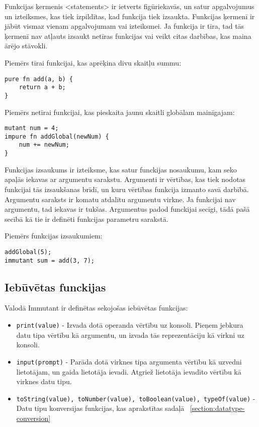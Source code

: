 \documentclass[12pt,a4paper]{report}
\begin{document}
Funkcijas ķermenis <statements> ir ietverts figūriekavās, un satur apgalvojumus un izteiksmes, kas tiek izpildītas, kad funkcija tiek izsaukta. Funkcijas ķermenī ir jābūt vismaz vienam apgalvojumam vai izteiksmei. Ja funkcija ir tīra, tad tās ķermenī nav atļauts izsaukt netīras funkcijas vai veikt citas darbības, kas maina ārējo stāvokli.

Piemērs tīrai funkcijai, kas aprēķina divu skaitļu summu:
\begin{verbatim}
pure fn add(a, b) {
    return a + b;
}
\end{verbatim}

Piemērs netīrai funkcijai, kas pieskaita jaunu skaitli globālam mainīgajam:
\begin{verbatim}
mutant num = 4;
impure fn addGlobal(newNum) {
    num += newNum;
}
\end{verbatim}

Funkcijas izsaukums ir izteiksme, kas satur funckijas nosaukumu, kam seko apaļās iekavas ar argumentu sarakstu. Argumenti ir vērtības, kas tiek nodotas funkcijai tās izsaukšanas brīdī, un kuru vērtības funkcija izmanto savā darbībā. Argumentu saraksts ir komatu atdalītu argumentu virkne. Ja funkcijai nav argumentu, tad iekavas ir tukšas. Argumentus padod funckijai secīgi, tādā pašā secībā kā tie ir definēti funkcijas parametru sarakstā. 

Piemērs funkcijas izsaukumiem:
\begin{verbatim}
addGlobal(5);
immutant sum = add(3, 7);
\end{verbatim}

\subsection{Iebūvētas funckijas}

Valodā Immutant ir definētas sekojošas iebūvētas funkcijas:
\begin{itemize}
  \item \texttt{print(value)} - Izvada dotā operanda vērtību uz konsoli. Pieņem jebkura datu tipa vērtību kā argumentu, un izvada tās reprezentāciju kā virkni uz konsoli.
  \item \texttt{input(prompt)} - Parāda dotā virknes tipa argumenta vērtību kā uzvedni lietotājam, un gaida lietotāja ievadi. Atgriež lietotāja ievadīto vērtību kā virknes datu tipu.
  \item \texttt{toString(value), toNumber(value), toBoolean(value), typeOf(value)} - Datu tipu konversijas funkcijas, kas aprakstītas sadaļā ~\ref{section:datatype-conversion}
\end{itemize}
\end{document}
